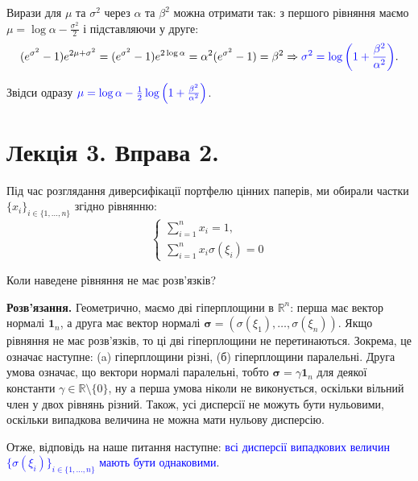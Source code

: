 \documentclass{hw_template}
\begin{document}
Вирази для $\mu$ та $\sigma^2$ через $\alpha$ та $\beta^2$ можна отримати так: з
першого рівняння маємо $\mu=\log\alpha - \frac{\sigma^2}{2}$ і підставляючи у друге:
\begin{equation*}
    (e^{\sigma^2}-1)e^{2\mu+\sigma^2} = (e^{\sigma^2}-1)e^{2\log\alpha} = \alpha^2(e^{\sigma^2}-1) = \beta^2 \Rightarrow \textcolor{blue}{\sigma^2 = \log\left(1+\frac{\beta^2}{\alpha^2}\right)}.
\end{equation*}

Звідси одразу $\textcolor{blue}{\mu = \log\alpha -
\frac{1}{2}\log\left(1+\frac{\beta^2}{\alpha^2}\right)}$.

\newpage

\section{Лекція 3. Вправа 2.}

\begin{problem}
    Під час розглядання диверсифікації портфелю цінних паперів, ми 
    обирали частки $\{x_i\}_{i \in \{1,\dots,n\}}$ згідно рівнянню:
    \begin{equation*}
        \begin{cases}
            \sum_{i=1}^n x_i = 1, \\
            \sum_{i=1}^n x_i\sigma(\xi_i) = 0
        \end{cases}
    \end{equation*}

    Коли наведене рівняння не має розв'язків?
\end{problem}

\textbf{Розв'язання.} Геометрично, маємо дві гіперплощини в $\mathbb{R}^n$:
перша має вектор нормалі $\mathbf{1}_n$, а друга має вектор нормалі
$\boldsymbol{\sigma} = (\sigma(\xi_1),\dots,\sigma(\xi_n))$. Якщо рівняння не
має розв'язків, то ці дві гіперплощини не перетинаються. Зокрема, це означає
наступне: (a) гіперплощини різні, (б) гіперплощини паралельні. Друга умова
означає, що вектори нормалі паралельні, тобто $\boldsymbol{\sigma} =
\gamma\mathbf{1}_n$ для деякої константи $\gamma \in \mathbb{R} \setminus
\{0\}$, ну а перша умова ніколи не виконується, оскільки вільний член у двох
рівнянь різний. Також, усі дисперсії не можуть бути нульовими, оскільки
випадкова величина не можна мати нульову дисперсію.

Отже, відповідь на наше питання наступне: \textcolor{blue}{всі дисперсії
випадкових величин $\{\sigma(\xi_i)\}_{i \in \{1,\dots,n\}}$ мають бути
однаковими}. 
\end{document}
